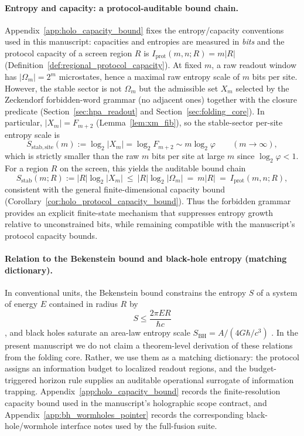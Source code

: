 \paragraph{Entropy and capacity: a protocol-auditable bound chain.}
Appendix~\ref{app:holo_capacity_bound} fixes the entropy/capacity conventions used in this manuscript: capacities and entropies are measured in \emph{bits} and the protocol capacity of a screen region $R$ is
$I_{\mathrm{prot}}(m,n;R)=m|R|$ (Definition~\ref{def:regional_protocol_capacity}).
At fixed $m$, a raw readout window has $|\Omega_m|=2^m$ microstates, hence a maximal raw entropy scale of $m$ bits per site.
However, the stable sector is not $\Omega_m$ but the admissible set $X_m$ selected by the Zeckendorf forbidden-word grammar (no adjacent ones) together with the closure predicate (Section~\ref{sec:hpa_readout} and Section~\ref{sec:folding_core}).
In particular, $|X_m|=F_{m+2}$ (Lemma~\ref{lem:xm_fib}), so the stable-sector per-site entropy scale is
\[
S_{\mathrm{stab,site}}(m):=\log_2|X_m|=\log_2 F_{m+2}\sim m\log_2\varphi
\qquad (m\to\infty),
\]
which is strictly smaller than the raw $m$ bits per site at large $m$ since $\log_2\varphi<1$.
For a region $R$ on the screen, this yields the auditable bound chain
\[
S_{\mathrm{stab}}(m;R):=|R|\log_2|X_m|
\ \le\ |R|\log_2|\Omega_m|
\ =\ m|R|
\ =\ I_{\mathrm{prot}}(m,n;R),
\]
consistent with the general finite-dimensional capacity bound (Corollary~\ref{cor:holo_protocol_capacity_bound}).
Thus the forbidden grammar provides an explicit finite-state mechanism that suppresses entropy growth relative to unconstrained bits, while remaining compatible with the manuscript's protocol capacity bounds.

\paragraph{Relation to the Bekenstein bound and black-hole entropy (matching dictionary).}
In conventional units, the Bekenstein bound constrains the entropy $S$ of a system of energy $E$ contained in radius $R$ by
\[
S\le \frac{2\pi ER}{\hbar c}
\]
\cite{Bekenstein1981}, and black holes saturate an area-law entropy scale $S_{\mathrm{BH}}=A/(4G\hbar/c^3)$ \cite{BardeenCarterHawking1973,Hawking1975,Bousso2002}.
In the present manuscript we do not claim a theorem-level derivation of these relations from the folding core.
Rather, we use them as a matching dictionary: the protocol assigns an information budget to localized readout regions, and the budget-triggered horizon rule supplies an auditable operational surrogate of information trapping.
Appendix~\ref{app:holo_capacity_bound} records the finite-resolution capacity bound used in the manuscript's holographic scope contract, and Appendix~\ref{app:bh_wormholes_pointer} records the corresponding black-hole/wormhole interface notes used by the full-fusion suite.

